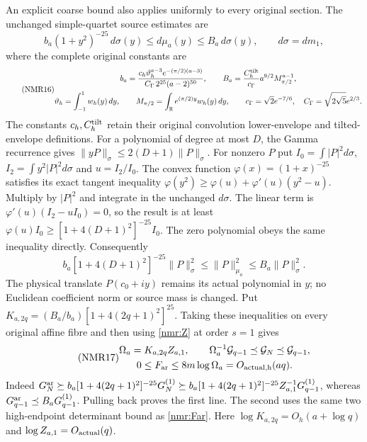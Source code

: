 An explicit coarse bound also applies uniformly to every original
section. The unchanged simple-quartet source estimates are
\[
b_a(1+y^2)^{-25}\,d\sigma(y)\leq d\mu_a(y)
\leq B_a\,d\sigma(y),\qquad d\sigma=dm_1,
\]
where the complete original constants are
\begin{equation}\tag{NMR16}\label{nmr:source-constants}
\begin{gathered}
b_a=\frac{c_h\vartheta_h^{a-3}e^{-(\pi/2)(a-3)}}
 {C_\Gamma\,2^{25}(a-2)^{50}},\qquad
B_a=\frac{C_h^{\rm tilt}}{c_\Gamma}
                   a^{9/2}M_{\pi/2}^{a-1},\\
\vartheta_h=\int_{-1}^{1}w_h(y)\,dy,\qquad
M_{\pi/2}=\int_{\mathbb R}e^{(\pi/2)y}w_h(y)\,dy,\qquad
c_\Gamma=\sqrt2e^{-7/6},\quad
C_\Gamma=\sqrt{2\sqrt5}e^{2/3}.
\end{gathered}
\end{equation}
The constants $c_h,C_h^{\rm tilt}$ retain their original
convolution lower-envelope and tilted-envelope definitions.
For a polynomial of degree at most $D$, the Gamma recurrence gives
$\|yP\|_\sigma\leq2(D+1)\|P\|_\sigma$.
For nonzero $P$ put $I_0=\int|P|^2d\sigma$,
$I_2=\int y^2|P|^2d\sigma$ and $u=I_2/I_0$.
The convex function $\varphi(x)=(1+x)^{-25}$ satisfies its exact
tangent inequality
$\varphi(y^2)\geq\varphi(u)+\varphi'(u)(y^2-u)$.
Multiply by $|P|^2$ and integrate in the unchanged $d\sigma$.
The linear term is $\varphi'(u)(I_2-uI_0)=0$, so the result is at
least $\varphi(u)I_0\geq[1+4(D+1)^2]^{-25}I_0$.
The zero polynomial obeys the same inequality directly. Consequently
\[
b_a[1+4(D+1)^2]^{-25}\|P\|_\sigma^2
\leq\|P\|_{\mu_a}^2\leq B_a\|P\|_\sigma^2 .
\]
The physical translate $P(c_0+iy)$ remains its actual polynomial
in $y$; no Euclidean coefficient norm or source mass is changed.
Put
$K_{a,2q}=(B_a/b_a)[1+4(2q+1)^2]^{25}$.
Taking these inequalities on every original affine fibre and then
using \eqref{nmr:Z} at order $s=1$ gives
\begin{equation}\tag{NMR17}\label{nmr:coarse}
\begin{gathered}
\Omega_a=K_{a,2q}Z_{a,1},\qquad
\Omega_a^{-1}\mathcal G_{q-1}\preceq
                 \mathcal G_N\preceq\mathcal G_{q-1},\\
0\leq F_{\rm ar}\leq8m\log\Omega_a=O_{\rm actual,h}(aq).
\end{gathered}
\end{equation}
Indeed $G_N^{\rm ar}\succeq
b_a[1+4(2q+1)^2]^{-25}G_N^{(1)}
\succeq b_a[1+4(2q+1)^2]^{-25}Z_{a,1}^{-1}G_{q-1}^{(1)}$,
whereas $G_{q-1}^{\rm ar}\preceq B_aG_{q-1}^{(1)}$.
Pulling back proves the first line. The second uses the same two
high-endpoint determinant bound as \eqref{nmr:Far}.
Here $\log K_{a,2q}=O_h(a+\log q)$ and $\log Z_{a,1}=O_{\rm actual}(q)$.

